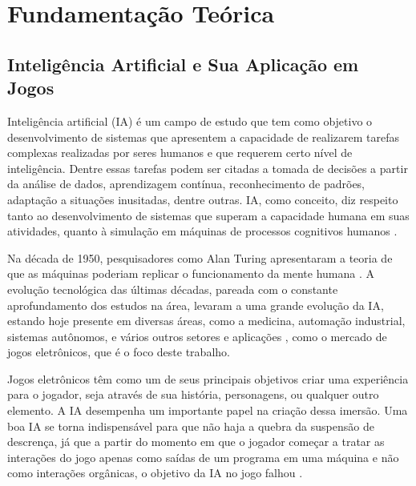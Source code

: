 \chapter[Fundamentação Teórica]{Fundamentação Teórica}\label{capitulo3}

\section{Inteligência Artificial e Sua Aplicação em Jogos}

Inteligência artificial (IA) é um campo de estudo que tem como objetivo o desenvolvimento de sistemas que apresentem a capacidade de realizarem tarefas complexas realizadas por seres humanos e que requerem certo nível de inteligência. Dentre essas tarefas podem ser citadas a tomada de decisões a partir da análise de dados, aprendizagem contínua, reconhecimento de padrões, adaptação a situações inusitadas, dentre outras. IA, como conceito, diz respeito tanto ao desenvolvimento de sistemas que superam a capacidade humana em suas atividades, quanto à simulação em máquinas de processos cognitivos humanos \cite{russel2020artificial}.

Na década de 1950, pesquisadores como Alan Turing apresentaram a teoria de que as máquinas poderiam replicar o funcionamento da mente humana \cite{turing1950computing}. A evolução tecnológica das últimas décadas, pareada com o constante aprofundamento dos estudos na área, levaram a uma grande evolução da IA, estando hoje presente em diversas áreas, como a medicina, automação industrial, sistemas autônomos, e vários outros setores e aplicações \cite{goodfellow2016deep}, como o mercado de jogos eletrônicos, que é o foco deste trabalho.

Jogos eletrônicos têm como um de seus principais objetivos criar uma experiência para o jogador, seja através de sua história, personagens, ou qualquer outro elemento. A IA desempenha um importante papel na criação dessa imersão. Uma boa IA se torna indispensável para que não haja a quebra da suspensão de descrença, já que a partir do momento em que o jogador começar a tratar as interações do jogo apenas como saídas de um programa em uma máquina e não como interações orgânicas, o objetivo da IA no jogo falhou \cite{dill2015whatis}.

